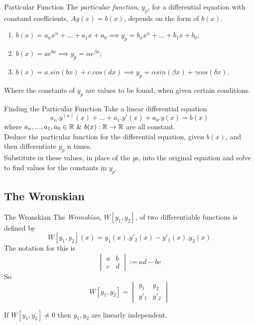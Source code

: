 \documentclass[11pt,a4paper]{article}
\begin{document}
\subtitle{Remark 6.09 - }{Particular Function}
The \textit{particular function}, $y_p$, for a differential equation with constand coefficients, $Ay(x) = b(x)$, depends on the form of $b(x)$.
\begin{enumerate}[label=\roman*)]
  \item $b(x) = a_nx^n + ... + a_1x + a_0 \implies y_p = b_nx^n + ... + b_1x + b_0$;
  \item $b(x) = ae^{bx} \implies y_p = \alpha e^{\beta x}$;
  \item $b(x) = a.sin(bx) + c.cos(dx) \implies y_p = \alpha sin(\beta x) + \gamma cos(\delta x)$.
\end{enumerate}
Where the constants of $y_p$ are values to be found, when given certain conditions.\\

\subtitle{Theorem 6.10 - }{Finding the Particular Function}
Take a linear differential equation $$a_n.y^{(n)}(x) + ... + a_1.y'(x) + a_0.y(x) = b(x)$$ where $a_n, ... , a_1, a_0 \in \real\ \mathrm{\&}\ b(x) : \real \to \real$ are all constant. \\
Deduce the particular function for the differential equation, given $b(x)$, and then differentiate $y_p$ n times. \\
Substitute in these values, in place of the $y$s, into the original equation and solve to find values for the constants in $y_p$. \\

\subsection{The Wronskian}

\subtitle{Definition 6.11 - }{The Wronskian}
The \textit{Wronskian}, $W[y_1, y_2]$, of two differentiable functions is defined by $$W[y_1, y_2](x) = y_1(x).y'_2(x) - y'_1(x).y_2(x)$$
The notation for this is $$\begin{vmatrix} a & b \\ c & d \end{vmatrix} := ad - bc$$
So $$W[y_1, y_2] = \begin{vmatrix} y_1 & y_2 \\ y'_1 & y'_2 \end{vmatrix}$$

\subtitle{Remark 6.12}{}
If $W[y_1, y_2] \not = 0$ then $y_1, y_2$ are linearly independent.
\end{document}
